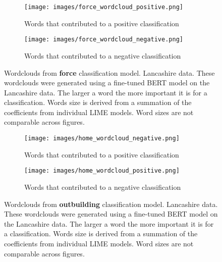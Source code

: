 \begin{figure}
     \centering
     \begin{subfigure}[b]{0.9\textwidth}
         \centering
         \texttt{[image: images/force\_wordcloud\_positive.png]}
         \caption{Words that contributed to a positive classification}
         \label{fig: wordcloud_force_lancs}
     \end{subfigure}
     \vfill
     \begin{subfigure}[b]{0.9\textwidth}
         \centering
         \texttt{[image: images/force\_wordcloud\_negative.png]}
         \caption{Words that contributed to a negative classification}
         \label{fig: wordcloud_force_rev_lancs}
     \end{subfigure}
        \caption{{Wordclouds from  \textbf{force} classification model. Lancashire data.} These wordclouds were generated using a fine-tuned BERT model on the Lancashire data. The larger a word the more important it is for a classification. Words size is derived from a summation of the coefficients from individual LIME models. Word sizes are not comparable across figures.}
        \label{fig:wordcloud_force_both_lancs}
        
\end{figure}




\begin{figure}
     \centering
     \begin{subfigure}[b]{0.9\textwidth}
         \centering
         \texttt{[image: images/home\_wordcloud\_negative.png]}
         \caption{Words that contributed to a positive classification}
         \label{fig: wordcloud_home_lancs}
     \end{subfigure}
     \vfill
     \begin{subfigure}[b]{0.9\textwidth}
         \centering
         \texttt{[image: images/home\_wordcloud\_positive.png]}
         \caption{Words that contributed to a negative classification}
         \label{fig: wordcloud_home_rev_lancs}
     \end{subfigure}
        \caption{{Wordclouds from  \textbf{outbuilding} classification model. Lancashire data.} These wordclouds were generated using a fine-tuned BERT model on the Lancashire data. The larger a word the more important it is for a classification. Words size is derived from a summation of the coefficients from individual LIME models. Word sizes are not comparable across figures.}
        \label{fig:wordcloud_home_both_lancs}
        
\end{figure}




